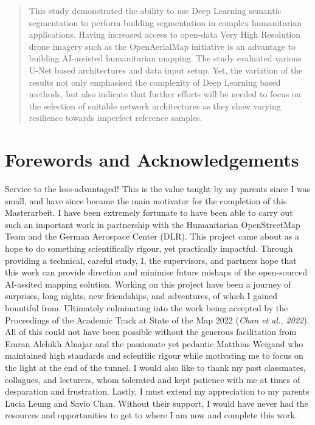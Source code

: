 \documentclass[11pt, a4paper, twoside]{report}
\begin{document}
\begin{abstract}
This study demonstrated the ability to use Deep Learning semantic segmentation to perform
building segmentation in complex humanitarian applications. Having increased access to
open-data Very High Resolution drone imagery such as the OpenAerialMap initiative is an advantage to
building AI-assisted humanitarian mapping. The study evaluated various U-Net based
architectures and data input setup. Yet, the variation of the results not only emphasised the
complexity of Deep Learning based methods, but also indicate that further efforts will be needed to
focus on the selection of suitable network architectures as they show varying resilience
towards imperfect reference samples.\\\par

\end{abstract}

\newpage

\section{Forewords and Acknowledgements}

Service to the less-advantaged! This is the value taught by my parents since I was small, and have since became the main motivator for the completion of this Masterarbeit. I have been extremely fortunate to have been able to carry out such an important work in partnership with the Humanitarian OpenStreetMap Team and the German Aerospace Center (DLR). This project came about as a hope to do something scientifically rigour, yet practically impactful. Through providing a technical, careful study, I, the supervisors, and partners hope that this work can provide direction and minimise future mishaps of the open-sourced AI-assited mapping solution. Working on this project have been a journey of surprises, long nights, new friendships, and adventures, of which I gained bountiful from. Ultimately culminating into the work being accepted by the Proceedings of the Academic Track at State of the Map 2022 (\textit{Chan et al., 2022}). All of this could not have been possible without the generous facilitation from Emran Alchikh Alnajar and the passionate yet pedantic Matthias Weigand who maintained high standards and scientific rigour while motivating me to focus on the light at the end of the tunnel. I would also like to thank my past classmates, collagues, and lecturers, whom tolerated and kept patience with me at times of desparation and frustration. Lastly, I must extend my appreciation to my parents Lucia Leung and Savio Chan. Without their support, I would have never had the resources and opportunities to get to where I am now and complete this work.
\end{document}
